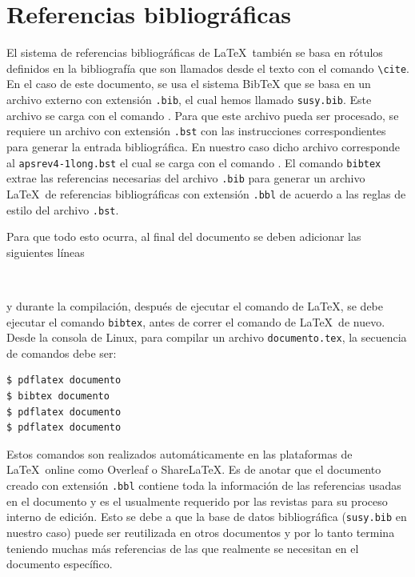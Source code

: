 \documentclass{article}
\begin{document}
\section{Referencias bibliográficas}
El sistema de referencias bibliográficas de \LaTeX\ también se basa en rótulos definidos en la bibliografía que son llamados desde el texto con el comando  \verb|\cite|. En el caso de este documento, se usa el sistema BibTeX que se basa en un archivo externo con extensión \verb|.bib|, el cual hemos llamado \verb|susy.bib|. Este archivo  se carga con el comando \verb||. Para que este archivo pueda ser procesado, se requiere un archivo con extensión \verb|.bst|  con las instrucciones correspondientes para generar la entrada bibliográfica. En nuestro caso dicho  archivo corresponde al \verb|apsrev4-1long.bst| el cual se carga con el comando \verb||.
El comando \verb|bibtex| extrae las referencias necesarias del archivo \verb|.bib| para generar un archivo \LaTeX\ de referencias bibliográficas con extensión \verb|.bbl| de acuerdo a las reglas de estilo del archivo \verb|.bst|.

Para que todo esto ocurra, al final del documento se deben adicionar las siguientes líneas 
\begin{lstlisting}


\end{lstlisting}
y durante la compilación, después de ejecutar el comando de \LaTeX, se debe ejecutar el comando \verb|bibtex|, antes de correr el comando de \LaTeX\ de nuevo. Desde la consola de Linux, para compilar un archivo \verb|documento.tex|, la secuencia de comandos debe ser:
\begin{lstlisting}
$ pdflatex documento 
$ bibtex documento
$ pdflatex documento 
$ pdflatex documento 
\end{lstlisting}
Estos comandos son realizados automáticamente en las plataformas de \LaTeX\ online como Overleaf o ShareLaTeX. 
Es de anotar que el documento creado con extensión \verb|.bbl| contiene toda la información de las referencias usadas en el documento y es el usualmente requerido por las revistas para su proceso interno de edición. Esto se debe a que la base de datos  bibliográfica (\verb|susy.bib| en nuestro caso)  puede ser reutilizada en otros documentos y por lo tanto termina teniendo muchas más referencias de las que realmente se necesitan en el documento específico.
\end{document}
